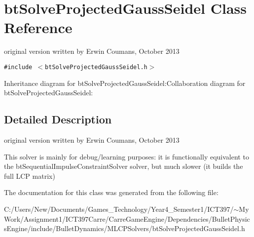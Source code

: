 \hypertarget{classbt_solve_projected_gauss_seidel}{
\section{btSolveProjectedGaussSeidel Class Reference}
\label{classbt_solve_projected_gauss_seidel}
}
original version written by Erwin Coumans, October 2013  


{\tt \#include $<$btSolveProjectedGaussSeidel.h$>$}

Inheritance diagram for btSolveProjectedGaussSeidel:Collaboration diagram for btSolveProjectedGaussSeidel:

\subsection{Detailed Description}
original version written by Erwin Coumans, October 2013 

This solver is mainly for debug/learning purposes: it is functionally equivalent to the btSequentialImpulseConstraintSolver solver, but much slower (it builds the full LCP matrix) 

The documentation for this class was generated from the following file:\begin{CompactItemize}
\item 
C:/Users/New/Documents/Games\_\-Technology/Year4\_\-Semester1/ICT397/$\sim$My Work/Assignment1/ICT397Carre/CarreGameEngine/Dependencies/BulletPhysicsEngine/include/BulletDynamics/MLCPSolvers/btSolveProjectedGaussSeidel.h\end{CompactItemize}
